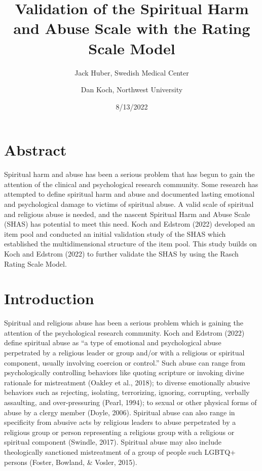 \documentclass[
  letterpaper,
  DIV=11,
  numbers=noendperiod]{scrreport}
\title{Validation of the Spiritual Harm and Abuse Scale with the Rating
Scale Model}
\author{Jack Huber, Swedish Medical Center \and Dan Koch, Northwest
University}
\date{8/13/2022}
\renewcommand*\contentsname{Table of contents}
\newcommand\contentsname{Table of contents}
\begin{document}
\maketitle
\ifdefined\Shaded\renewenvironment{Shaded}{\begin{tcolorbox}[breakable, enhanced, interior hidden, frame hidden, borderline west={3pt}{0pt}{shadecolor}, boxrule=0pt, sharp corners]}{\end{tcolorbox}}\fi

\renewcommand*\contentsname{Table of contents}
{
\hypersetup{linkcolor=}
\setcounter{tocdepth}{2}
\tableofcontents
}

\hypertarget{abstract}{%
\chapter*{Abstract}\label{abstract}}

Spiritual harm and abuse has been a serious problem that has begun to
gain the attention of the clinical and psychological research community.
Some research has attempted to define spiritual harm and abuse and
documented lasting emotional and psychological damage to victims of
spiritual abuse. A valid scale of spiritual and religious abuse is
needed, and the nascent Spiritual Harm and Abuse Scale (SHAS) has
potential to meet this need. Koch and Edstrom (2022) developed an item
pool and conducted an initial validation study of the SHAS which
established the multidimensional structure of the item pool. This study
builds on Koch and Edstrom (2022) to further validate the SHAS by using
the Rasch Rating Scale Model.


\hypertarget{introduction}{%
\chapter*{Introduction}\label{introduction}}

Spiritual and religious abuse has been a serious problem which is
gaining the attention of the psychological research community. Koch and
Edstrom (2022) define spiritual abuse as ``a type of emotional and
psychological abuse perpetrated by a religious leader or group and/or
with a religious or spiritual component, usually involving coercion or
control.'' Such abuse can range from psychologically controlling
behaviors like quoting scripture or invoking divine rationale for
mistreatment (Oakley et al., 2018); to diverse emotionally abusive
behaviors such as rejecting, isolating, terrorizing, ignoring,
corrupting, verbally assaulting, and over-pressuring (Pearl, 1994); to
sexual or other physical forms of abuse by a clergy member (Doyle,
2006). Spiritual abuse can also range in specificity from abusive acts
by religious leaders to abuse perpetrated by a religious group or person
representing a religious group with a religious or spiritual component
(Swindle, 2017). Spiritual abuse may also include theologically
sanctioned mistreatment of a group of people such LGBTQ+ persons
(Foster, Bowland, \& Vosler, 2015).
\end{document}
